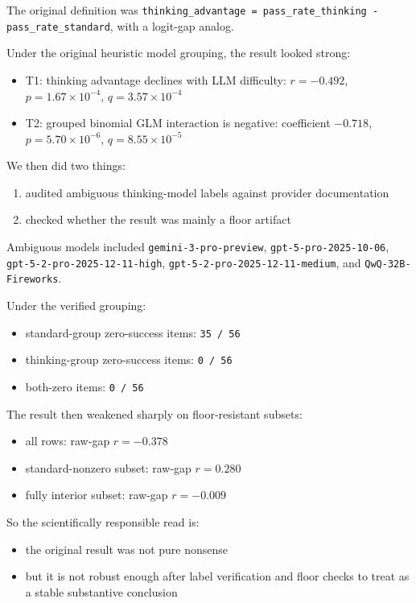 \documentclass[11pt]{article}
\begin{document}
The original definition was \texttt{thinking\_advantage = pass\_rate\_thinking - pass\_rate\_standard}, with a logit-gap analog.

Under the original heuristic model grouping, the result looked strong:

\begin{itemize}
  \item T1: thinking advantage declines with LLM difficulty: $r = -0.492$, $p = 1.67\times10^{-4}$, $q = 3.57\times10^{-4}$
  \item T2: grouped binomial GLM interaction is negative: coefficient $-0.718$, $p = 5.70\times10^{-6}$, $q = 8.55\times10^{-5}$
\end{itemize}

We then did two things:

\begin{enumerate}
  \item audited ambiguous thinking-model labels against provider documentation
  \item checked whether the result was mainly a floor artifact
\end{enumerate}

Ambiguous models included \texttt{gemini-3-pro-preview}, \texttt{gpt-5-pro-2025-10-06}, \texttt{gpt-5-2-pro-2025-12-11-high}, \texttt{gpt-5-2-pro-2025-12-11-medium}, and \texttt{QwQ-32B-Fireworks}.

Under the verified grouping:

\begin{itemize}
  \item standard-group zero-success items: \texttt{35 / 56}
  \item thinking-group zero-success items: \texttt{0 / 56}
  \item both-zero items: \texttt{0 / 56}
\end{itemize}

The result then weakened sharply on floor-resistant subsets:

\begin{itemize}
  \item all rows: raw-gap $r = -0.378$
  \item standard-nonzero subset: raw-gap $r = 0.280$
  \item fully interior subset: raw-gap $r = -0.009$
\end{itemize}

So the scientifically responsible read is:

\begin{itemize}
  \item the original result was not pure nonsense
  \item but it is not robust enough after label verification and floor checks to treat as a stable substantive conclusion
\end{itemize}
\end{document}
